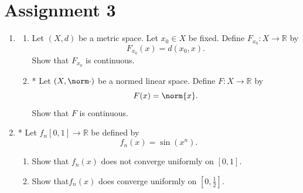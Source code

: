 \documentclass[notoc,notitlepage]{tufte-book}
\begin{document}

\chapter{Assignment 3}%
\label{chp:assignment_3}

\begin{enumerate}
  \item \begin{enumerate}
    \item Let $(X, d)$ be a metric space. Let $x_0 \in X$ be fixed. Define $F_{x_0} : X \to \mathbb{R}$ by
      \begin{equation*}
        F_{x_0}(x) = d(x_0, x).
      \end{equation*}
      Show that $F_{x_0}$ is continuous.
    \item * Let $(X, \norm\cdot)$ be a normed linear space. Define $F : X \to \mathbb{R}$ by
      \begin{equation*}
        F(x) = \norm{x}.
      \end{equation*}
      Show that $F$ is continuous.
    \end{enumerate}

  \item * Let $f_n [ 0, 1 ] \to \mathbb{R}$ be defined by
    \begin{equation*}
      f_n(x) = \sin(x^n).
    \end{equation*}
    \begin{enumerate}
      \item Show that $f_n(x)$ does not converge uniformly on $[0, 1]$.
      \item Show that$f_n(x)$ does converge uniformly on $\left[0, \frac{1}{2}\right]$.
    \end{enumerate}


\end{enumerate}
\end{document}
